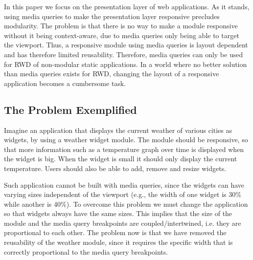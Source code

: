 \documentclass{acm_proc_article-sp}
\begin{document}
  In this paper we focus on the presentation layer of web applications.
  As it stands, using media queries to make the presentation layer responsive precludes modularity.
  The problem is that there is no way to make a module responsive without it being context-aware, due to media queries only being able to target the viewport.
  Thus, a responsive module using media queries is layout dependent and has therefore limited reusability.
  Therefore, media queries can only be used for RWD of non-modular static applications.
  In a world where no better solution than media queries exists for RWD, changing the layout of a responsive application becomes a cumbersome task.

  \subsection{The Problem Exemplified}
    
    Imagine an application that displays the current weather of various cities as widgets, by using a weather widget module.
    The module should be responsive, so that more information such as a temperature graph over time is displayed when the widget is big.
    When the widget is small it should only display the current temperature.
    Users should also be able to add, remove and resize widgets.

    Such application cannot be built with media queries, since the widgets can have varying sizes independent of the viewport (e.g., the width of one widget is 30\% while another is 40\%).
    To overcome this problem we must change the application so that widgets always have the same sizes.
    This implies that the size of the module and the media query breakpoints are coupled/intertwined, i.e. they are proportional to each other.
    The problem now is that we have removed the reusability of the weather module, since it requires the specific width that is correctly proportional to the media query breakpoints. 
\end{document}
